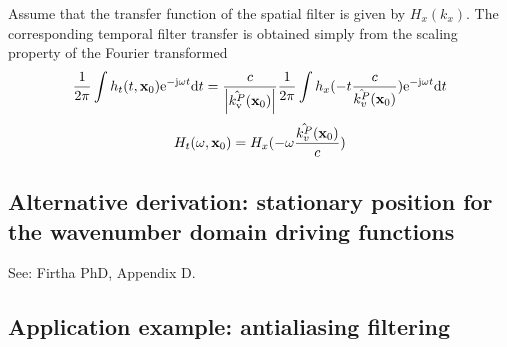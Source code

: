 \documentclass[12pt,a4paper]{article}
\begin{document}
Assume that the transfer function of the spatial filter is given by $H_x(k_x)$.
The corresponding temporal filter transfer is obtained simply from the scaling property of the Fourier transformed
\begin{equation}
    \frac{1}{2\pi}\int h_t(t, \mathbf{x}_0) \mathrm{e}^{-\mathrm{j} \omega t} \mathrm{d} t  = \frac{c}{\left| \hat{k_\mathrm{v}^P}( \mathbf{x}_0 ) \right| } \frac{1}{2\pi} \int 
     h_x(-t \frac{c}{\hat{k_v^P}(\mathbf{x}_0)}) \mathrm{e}^{-\mathrm{j} \omega t} \mathrm{d} t
\end{equation}
\begin{equation}
 H_t(\omega, \mathbf{x}_0) =  H_x( -\omega\frac{\hat{k_v^P}(\mathbf{x}_0)}{c}) 
\end{equation}


\subsection{Alternative derivation: stationary position for the wavenumber domain driving functions}
See: Firtha PhD, Appendix D.

\subsection{Application example: antialiasing filtering}
\end{document}
